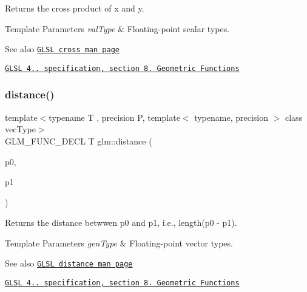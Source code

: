 Returns the cross product of x and y.


\begin{DoxyTemplParams}{Template Parameters}
{\em val\+Type} & Floating-\/point scalar types.\\
\hline
\end{DoxyTemplParams}
\begin{DoxySeeAlso}{See also}
\href{http://www.opengl.org/sdk/docs/manglsl/xhtml/cross.xml}{\tt G\+L\+SL cross man page} 

\href{http://www.opengl.org/registry/doc/GLSLangSpec.4.20.8.pdf}{\tt G\+L\+SL 4.. specification, section 8. Geometric Functions} 
\end{DoxySeeAlso}
\mbox{\label{group__core__func__geometric_ga7ca317dde0d7e94d920153554d4a02a8}} 
\subsubsection{\texorpdfstring{distance()}{distance()}}
{\footnotesize\ttfamily template$<$typename T , precision P, template$<$ typename, precision $>$ class vec\+Type$>$ \\
G\+L\+M\+\_\+\+F\+U\+N\+C\+\_\+\+D\+E\+CL T glm\+::distance (\begin{DoxyParamCaption}\item[{vec\+Type$<$ T, P $>$ const \&}]{p0,  }\item[{vec\+Type$<$ T, P $>$ const \&}]{p1 }\end{DoxyParamCaption})}

Returns the distance betwwen p0 and p1, i.\+e., length(p0 -\/ p1).


\begin{DoxyTemplParams}{Template Parameters}
{\em gen\+Type} & Floating-\/point vector types.\\
\hline
\end{DoxyTemplParams}
\begin{DoxySeeAlso}{See also}
\href{http://www.opengl.org/sdk/docs/manglsl/xhtml/distance.xml}{\tt G\+L\+SL distance man page} 

\href{http://www.opengl.org/registry/doc/GLSLangSpec.4.20.8.pdf}{\tt G\+L\+SL 4.. specification, section 8. Geometric Functions} 
\end{DoxySeeAlso}
\mbox{\label{group__core__func__geometric_ga7dada304da2ba7dd3376ab4f178c3f6b}} 

